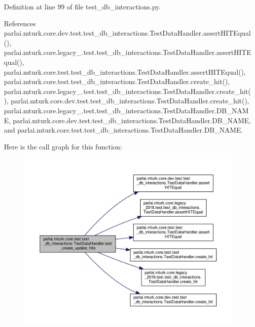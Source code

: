 Definition at line 99 of file test\+\_\+db\+\_\+interactions.\+py.



References parlai.\+mturk.\+core.\+dev.\+test.\+test\+\_\+db\+\_\+interactions.\+Test\+Data\+Handler.\+assert\+H\+I\+T\+Equal(), parlai.\+mturk.\+core.\+legacy\+\_.\+test.\+test\+\_\+db\+\_\+interactions.\+Test\+Data\+Handler.\+assert\+H\+I\+T\+Equal(), parlai.\+mturk.\+core.\+test.\+test\+\_\+db\+\_\+interactions.\+Test\+Data\+Handler.\+assert\+H\+I\+T\+Equal(), parlai.\+mturk.\+core.\+test.\+test\+\_\+db\+\_\+interactions.\+Test\+Data\+Handler.\+create\+\_\+hit(), parlai.\+mturk.\+core.\+legacy\+\_.\+test.\+test\+\_\+db\+\_\+interactions.\+Test\+Data\+Handler.\+create\+\_\+hit(), parlai.\+mturk.\+core.\+dev.\+test.\+test\+\_\+db\+\_\+interactions.\+Test\+Data\+Handler.\+create\+\_\+hit(), parlai.\+mturk.\+core.\+legacy\+\_.\+test.\+test\+\_\+db\+\_\+interactions.\+Test\+Data\+Handler.\+D\+B\+\_\+\+N\+A\+ME, parlai.\+mturk.\+core.\+dev.\+test.\+test\+\_\+db\+\_\+interactions.\+Test\+Data\+Handler.\+D\+B\+\_\+\+N\+A\+ME, and parlai.\+mturk.\+core.\+test.\+test\+\_\+db\+\_\+interactions.\+Test\+Data\+Handler.\+D\+B\+\_\+\+N\+A\+ME.

Here is the call graph for this function\+:
\nopagebreak
\begin{figure}[H]
\begin{center}
\leavevmode
\includegraphics[width=350pt]{classparlai_1_1mturk_1_1core_1_1test_1_1test__db__interactions_1_1TestDataHandler_a908018363b47f8e72677fbd0dc29a600_cgraph}
\end{center}
\end{figure}
\mbox{\label{classparlai_1_1mturk_1_1core_1_1test_1_1test__db__interactions_1_1TestDataHandler_a8fcba0662ee9a0b8d74287e984a86c39}} 
